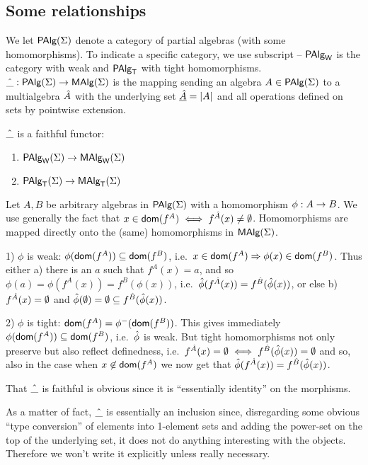 \documentclass[10pt]{article}
\begin{document}

\subsection{Some relationships}

We let $\mbox{\rm\sf PAlg}(\Sigma)$ denote a category of partial algebras (with some
homomorphisms). To indicate a specific category, we use subscript --
$\mbox{\rm\sf PAlg}_{\sf W}$ is the category with weak and $\mbox{\rm\sf PAlg}_{\sf T}$ with tight homomorphisms.
$\hat{\_}:\mbox{\rm\sf PAlg}(\Sigma)\rightarrow\mbox{\rm\sf MAlg}(\Sigma)$ is the mapping sending an algebra $A\in\mbox{\rm\sf PAlg}(\Sigma)$
to a multialgebra $\hat{A}$ with the underlying set $\underline {\hat{A}}=|A|$ and all operations defined on sets by pointwise extension.

\begin{Fact}
\label{fa:faith} 
$\hat{\_}$ is a faithful functor:
\begin{enumerate}\MyLPar
\item $\mbox{\rm\sf PAlg}_{\sf W}(\Sigma)\rightarrow\mbox{\rm\sf MAlg}_{\sf W}(\Sigma)$ 
\item $\mbox{\rm\sf PAlg}_{\sf T}(\Sigma)\rightarrow\mbox{\rm\sf MAlg}_{\sf T}(\Sigma)$
\end{enumerate}
\end{Fact}

\begin{Proof}
Let $A,B$ be arbitrary algebras in $\mbox{\rm\sf PAlg}(\Sigma)$ with a homomorphism
$\phi:A\rightarrow B$.  We use generally the fact that $ x\in\mbox{\sf dom}(f^A)
\iff f^{\hat{A}}(x)\not=\emptyset$.  Homomorphisms are mapped directly
onto the (same) homomorphisms in $\mbox{\rm\sf MAlg}(\Sigma)$.

1) $\phi$ is weak: $\phi(\mbox{\sf dom}(f^A))\subseteq\mbox{\sf dom}(f^B)$, i.e.\
$x\in\mbox{\sf dom}(f^A)\Rightarrow \phi(x)\in\mbox{\sf dom}(f^B)$.  Thus either a) there is an
$a$ such that $f^{A}(x) = a$, and so $\phi(a)=\phi(f^A(x))=
f^B(\phi(x))$, i.e.\ $\hat{\phi}(f^{\hat{A}}(x))=f^{\hat{B}}(\hat{\phi}(x))$, or else b) $f^{\hat{A}}(x)=\emptyset$ and
$\hat{\phi}(\emptyset)=\emptyset\subseteq f^{\hat{B}}(\hat{\phi}(x))$.

2) $\phi$ is tight: $\mbox{\sf dom}(f^A)=\phi^-(\mbox{\sf dom}(f^B))$. This gives
immediately $\phi(\mbox{\sf dom}(f^A))\subseteq\mbox{\sf dom}(f^B)$, i.e.\ $\hat{\phi}$ is
weak. But tight homomorphisms not only preserve but also reflect definedness,
i.e.\ $f^{\hat{A}}(x)=\emptyset\iff f^{\hat{B}}(\hat{\phi}(x))=\emptyset$ and so, also
in the case when $ x\not\in\mbox{\sf dom}(f^A)$ we now get that
$\hat{\phi}(f^{\hat{A}}(x))= f^{\hat{B}}(\hat{\phi}(x))$.

That $\hat{\_}$ is faithful is obvious since it is ``essentially
identity'' on the morphisms.
\end{Proof}

As a matter of fact, $\hat{\_}$ is essentially an inclusion since,
disregarding some obvious ``type conversion'' of elements into
1-element sets and adding the power-set on the top of the underlying
set, it does not do anything interesting with the objects. Therefore
we won't write it explicitly unless really necessary.
\end{document}
